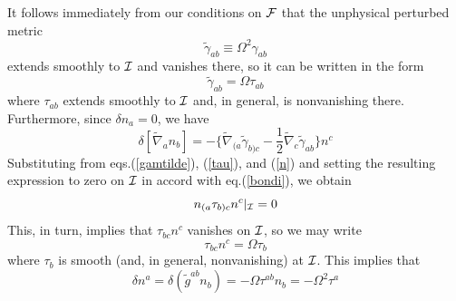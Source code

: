 It follows immediately from our conditions on ${\cal F}$ that the
unphysical perturbed metric
\begin{equation}
\tilde{\gamma}_{ab} \equiv \Omega^2 \gamma_{ab}
\label{gamtilde}
\end{equation}
extends smoothly to ${\cal I}$ and vanishes there, so it can be
written in the form
\begin{equation}
\tilde{\gamma}_{ab} = \Omega \tau_{ab}
\label{tau}
\end{equation}
where $\tau_{ab}$ extends smoothly to ${\cal I}$ and, in general, is
nonvanishing there. Furthermore, since $\delta n_a = 0$, we have
\begin{equation}
\delta [\tilde{\nabla}_a n_b] = - \{ \tilde{\nabla}_{(a}
\tilde{\gamma}_{b)c} - \frac{1}{2} \tilde{\nabla}_c
\tilde{\gamma}_{ab} \} n^c
\label{dbondi}
\end{equation}
Substituting from eqs.(\ref{gamtilde}),
(\ref{tau}), and (\ref{n}) and setting the resulting expression to
zero on ${\cal I}$ in accord with eq.(\ref{bondi}), we obtain
\begin{equation}
n_{(a} \tau_{b)c} n^c |_{\cal I} = 0
\label{taun}
\end{equation}
This, in turn, implies that $\tau_{bc} n^c$ vanishes on ${\cal I}$, so
we may write
\begin{equation}
\tau_{bc} n^c = \Omega \tau_b 
\label{taub}
\end{equation}
where $\tau_b$ is smooth (and, in general, nonvanishing) at ${\cal I}$.
This implies that
\begin{equation}
\delta n^a = \delta (\tilde{g}^{ab} n_b) = - \Omega \tau^{ab} n_b = -
\Omega^2 \tau^a
\label{dn}
\end{equation}

